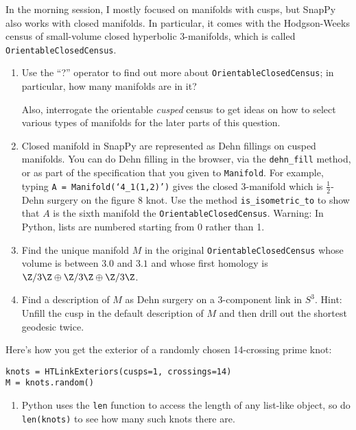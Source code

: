 \documentclass[tikz, a4paper]{nmd/hw}
\begin{document}
\begin{problems}
\item In the morning session, I mostly focused on manifolds with
  cusps, but SnapPy also works with closed manifolds.  In particular,
  it comes with the Hodgson-Weeks census of small-volume closed
  hyperbolic 3-manifolds, which is called
  \texttt{OrientableClosedCensus}.

  \begin{enumerate}
    \item Use the ``?'' operator to find out more about
      \texttt{OrientableClosedCensus}; in particular, how many
      manifolds are in it?  

      Also, interrogate the orientable \emph{cusped} census to get
      ideas on how to select various types of manifolds for the later
      parts of this question.
      
    \item Closed manifold in SnapPy are represented as Dehn fillings
      on cusped manifolds.  You can do Dehn filling in the browser,
      via the \texttt{dehn\_fill} method, or as part of the
      specification that you given to \texttt{Manifold}.  For example,
      typing \texttt{A = Manifold(`4\_1(1,2)')} gives the closed
      3-manifold which is $\frac{1}{2}$-Dehn surgery on the figure 8
      knot.  Use the method \texttt{is\_isometric\_to} to show that
      $A$ is the sixth manifold the \texttt{OrientableClosedCensus}.
      Warning: In Python, lists are numbered starting from 0
      rather than 1.

    \item Find the unique manifold $M$ in the original
      \texttt{OrientableClosedCensus} whose volume is between $3.0$
      and $3.1$ and whose first homology is
      $\Z/3\Z \oplus \Z/3\Z \oplus \Z/3\Z$.

    \item Find a description of $M$ as Dehn surgery on a 3-component
      link in $S^3$.  Hint: Unfill the cusp in the default description
      of $M$ and then drill out the shortest geodesic twice.  

  \end{enumerate}

\item Here's how you get the exterior of a randomly chosen 14-crossing prime knot:

  \texttt{knots = HTLinkExteriors(cusps=1, crossings=14)} \\ 
  \texttt{M = knots.random()}

  \begin{enumerate}
    \item Python uses the \texttt{len} function to access the length of any
      list-like object, so do \texttt{len(knots)} to see how many such
      knots there are.


\end{enumerate}
\end{problems}
\end{document}
